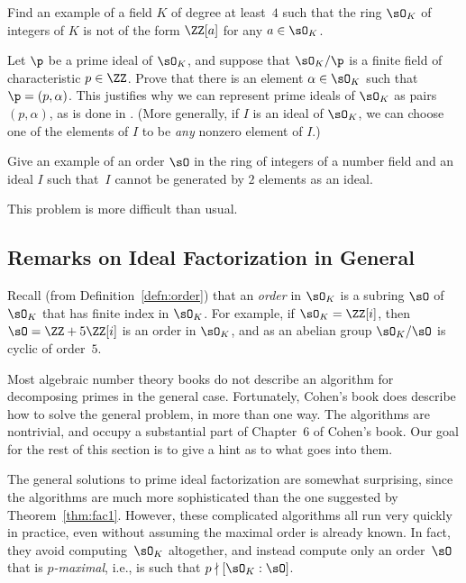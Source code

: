 \begin{exercise}
  Find an example of a field $K$ of degree at least~$4$ such that the ring
  $\sO_K$ of integers of $K$ is not of the form $\ZZ[a]$ for any $a\in \sO_K$.
\end{exercise}

\begin{exercise}
  Let $\p$ be a prime ideal of $\sO_K$, and suppose that $\sO_K/\p$
  is a finite field of characteristic $p\in\ZZ$.  Prove that there is
  an element $\alpha\in\sO_K$ such that $\p=(p,\alpha)$.  This
  justifies why we can represent prime ideals of $\sO_K$ as pairs
  $(p,\alpha)$, as is done in {\Sage}. (More generally, if $I$ is an
  ideal of $\sO_K$, we can choose one of the elements of $I$ to be {\em
  any} nonzero element of $I$.)
\end{exercise}

\begin{exercise}
  Give an example of an order $\sO$ in the ring of integers of
  a number field and an ideal $I$ such that~$I$ cannot be generated by
  $2$ elements as an ideal.

  \begin{hint}
    This problem is more difficult than usual.
  \end{hint}
\end{exercise}

\subsection{Remarks on Ideal Factorization in General}

Recall (from Definition~\ref{defn:order}) that an {\em order} in $\sO_K$ is
a subring $\sO$ of $\sO_K$ that has finite index in $\sO_K$.  For
example, if $\sO_K = \ZZ[i]$, then $\sO = \ZZ + 5\ZZ[i]$ is an order in $\sO_K$,
and as an abelian group $\sO_K/\sO$ is cyclic of order~$5$.

Most algebraic number theory books do not describe an algorithm for
decomposing primes in the general case.  Fortunately, Cohen's book
\cite[Ch.~6]{cohen:course_ant} does describe how to solve the general
problem, in more than one way.  The algorithms are nontrivial, and
occupy a substantial part of Chapter~6 of Cohen's book.  Our goal
for the rest of this section is to give a hint as to what goes into them.

The general solutions to prime ideal factorization are somewhat surprising,
since the algorithms are much more sophisticated than the one
suggested by Theorem~\ref{thm:fac1}.  However, these complicated
algorithms all run very quickly in practice, even without assuming the
maximal order is already known.  In fact, they avoid computing~$\sO_K$
altogether, and instead compute only an order~$\sO$ that is {\em $p$-maximal},
i.e., is such that $p \nmid [\sO_K:\sO]$.

